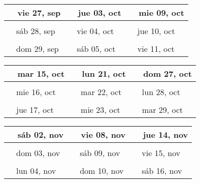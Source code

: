 \documentclass[letterpaper,10pt]{article}
\begin{document}
\begin{tabular}{lll}
\\
{\ \ vie 27, sep\hspace{4.5cm}\vspace{2.25cm}} &{\ \ jue 03, oct\hspace{4.5cm}} &{\ \ mie 09, oct\hspace{4.5cm}}
\\ \hline \\
{\ \ sáb 28, sep\vspace{2.25cm}} & {\ \ vie 04, oct} & {\ \ jue 10, oct}
\\ \hline \\
{\ \ dom 29, sep\vspace{2.25cm}} & {\ \ sáb 05, oct} & {\ \ vie 11, oct}
\\
\end{tabular}\par
\begin{tabular}{lll}
\\
{\ \ mar 15, oct\hspace{4.5cm}\vspace{2.25cm}} &{\ \ lun 21, oct\hspace{4.5cm}} &{\ \ dom 27, oct\hspace{4.5cm}}
\\ \hline \\
{\ \ mie 16, oct\vspace{2.25cm}} & {\ \ mar 22, oct} & {\ \ lun 28, oct}
\\ \hline \\
{\ \ jue 17, oct\vspace{2.25cm}} & {\ \ mie 23, oct} & {\ \ mar 29, oct}
\\
\end{tabular}\par
\begin{tabular}{lll}
\\
{\ \ sáb 02, nov\hspace{4.5cm}\vspace{2.25cm}} &{\ \ vie 08, nov\hspace{4.5cm}} &{\ \ jue 14, nov\hspace{4.5cm}}
\\ \hline \\
{\ \ dom 03, nov\vspace{2.25cm}} & {\ \ sáb 09, nov} & {\ \ vie 15, nov}
\\ \hline \\
{\ \ lun 04, nov\vspace{2.25cm}} & {\ \ dom 10, nov} & {\ \ sáb 16, nov}
\\
\end{tabular}\par
\end{document}

